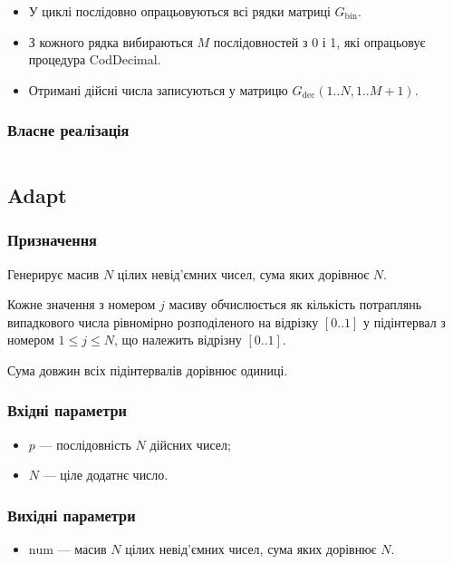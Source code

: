 \documentclass[a4paper, 12pt]{article}
\numberwithin{equation}{section}
\begin{document}
\begin{itemize}
    \item У циклі послідовно опрацьовуються всі рядки матриці $G_{\text{bin}}$. 
    \item З кожного рядка вибираються $M$ послідовностей з 0 і 1, які опрацьовує процедура CodDecimal. 
    \item Отримані дійсні числа записуються у матрицю $G_{\text{dec}}(1..N,1..M+1)$.
\end{itemize}

\subsubsection*{Власне реалізація}

\inputminted[firstline=27, lastline=66]{python}{../code/cod_decimal.py}

\subsection{Adapt}

\subsubsection*{Призначення}

Генерирує масив $N$ цілих невід'ємних чисел, сума яких дорівнює $N$. \medskip

Кожне значення з номером $j$ масиву обчислюється як кількість потраплянь випадкового числа рівномірно розподіленого на відрізку $[0..1]$ у підінтервал з номером $1 \le j \le N$, що належить відрізну $[0..1]$. \medskip

Сума довжин всіх підінтервалів дорівнює одиниці.

\subsubsection*{Вхідні параметри}

\begin{itemize}
    \item $p$ --- послідовність $N$ дійсних чисел;
    \item $N$ --- ціле додатнє число.
\end{itemize}

\subsubsection*{Вихідні параметри}

\begin{itemize}
    \item $\text{num}$ --- масив $N$ цілих невід'ємних чисел, сума яких дорівнює $N$.
\end{itemize}
\end{document}
